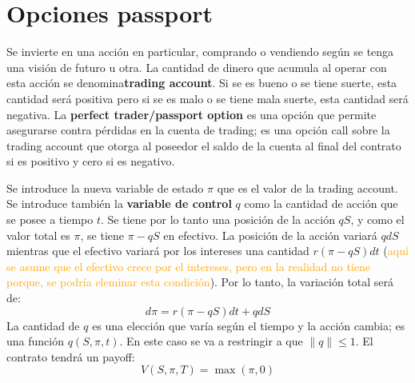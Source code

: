\section{Opciones passport}
Se invierte en una acción en particular, comprando o vendiendo según se tenga una visión de futuro u otra. La cantidad de dinero que acumula al operar con esta acción se denomina\textbf{trading account}. Si se es bueno o se tiene suerte, esta cantidad será positiva pero si se es malo o se tiene mala suerte, esta cantidad será negativa. La \textbf{perfect trader/passport option} es una opción que permite asegurarse contra pérdidas en la cuenta de trading; es una opción call sobre la trading account que otorga al poseedor el saldo de la cuenta al final del contrato si es positivo y cero si es negativo.

Se introduce la nueva variable de estado $\pi$ que es el valor de la trading account. Se introduce también la \textbf{variable de control} $q$ como la cantidad de acción que se posee a tiempo $t$. Se tiene por lo tanto una posición de la acción $q S$, y como el valor total es $\pi$, se tiene $\pi - q S$ en efectivo. La posición de la acción variará $q dS$ mientras que el efectivo variará por los intereses una cantidad $r(\pi - q S)dt$ (\textcolor{orange}{aquí se asume que el efectivo crece por el intereses, pero en la realidad no tiene porque, se podría eleminar esta condición}). Por lo tanto, la variación total será de:
\begin{equation*}
    d\pi = r(\pi - q S)dt + q dS
\end{equation*}
La cantidad de $q$ es una elección que varía según el tiempo y la acción cambia; es una función $q(S,\pi,t)$. En este caso se va a restringir a que $\|q\| \leq 1$. El contrato tendrá un payoff:
\begin{equation*}
    \boxed{V(S,\pi,T) = \max(\pi,0)}
\end{equation*}

